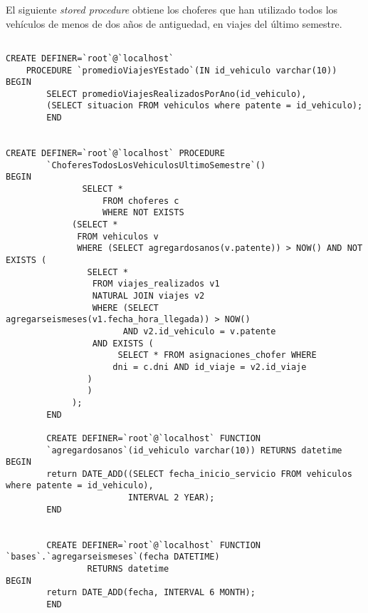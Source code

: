 El siguiente \textit{stored procedure} obtiene los choferes que han utilizado todos los veh\'iculos de menos de dos a\~nos 
de antiguedad, en viajes del \'ultimo semestre.

\begin{verbatim}

CREATE DEFINER=`root`@`localhost` 
	PROCEDURE `promedioViajesYEstado`(IN id_vehiculo varchar(10))
BEGIN
		SELECT promedioViajesRealizadosPorAno(id_vehiculo), 
		(SELECT situacion FROM vehiculos where patente = id_vehiculo);
		END
		
		
CREATE DEFINER=`root`@`localhost` PROCEDURE  
		`ChoferesTodosLosVehiculosUltimoSemestre`()
BEGIN
		       SELECT *
	       	       FROM choferes c
	       	       WHERE NOT EXISTS
			 (SELECT *
			  FROM vehiculos v
			  WHERE (SELECT agregardosanos(v.patente)) > NOW() AND NOT EXISTS (
				SELECT *
				 FROM viajes_realizados v1
				 NATURAL JOIN viajes v2
				 WHERE (SELECT agregarseismeses(v1.fecha_hora_llegada)) > NOW()
				       AND v2.id_vehiculo = v.patente
				 AND EXISTS (
				      SELECT * FROM asignaciones_chofer WHERE
					 dni = c.dni AND id_viaje = v2.id_viaje
				)      
				) 
			 );
		END
		
		CREATE DEFINER=`root`@`localhost` FUNCTION  
		`agregardosanos`(id_vehiculo varchar(10)) RETURNS datetime
BEGIN
		return DATE_ADD((SELECT fecha_inicio_servicio FROM vehiculos where patente = id_vehiculo), 
						INTERVAL 2 YEAR);
		END
		

		CREATE DEFINER=`root`@`localhost` FUNCTION  `bases`.`agregarseismeses`(fecha DATETIME) 
				RETURNS datetime
BEGIN
		return DATE_ADD(fecha, INTERVAL 6 MONTH);
		END
		
		
\end{verbatim}


